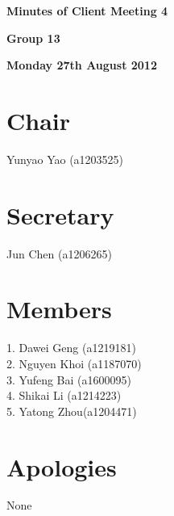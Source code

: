 \documentclass[11pt, a4paper]{article}
\begin{document}
 



\vspace*{15pt}

\begin{center}
\huge \bf Minutes of Client Meeting 4
\end{center}


\begin{center}
\Large \bf Group 13
\end{center}

\begin{center}
\Large \bf Monday 27th August 2012
\end{center}

\section*{Chair}
 Yunyao Yao (a1203525)

\section*{Secretary}
Jun Chen (a1206265)

\section*{Members}
1. Dawei Geng (a1219181)\\
2. Nguyen Khoi (a1187070)\\
3. Yufeng Bai (a1600095)\\
4. Shikai Li (a1214223)\\
5. Yatong Zhou(a1204471)

\vspace*{10pt}

\section*{Apologies}
None
\end{document}

